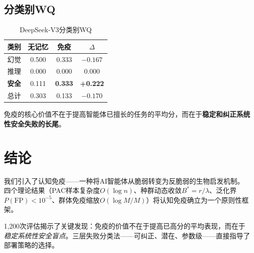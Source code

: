 \documentclass[11pt,a4paper]{article}
\begin{document}
\subsection{分类别WQ}

\begin{table}[h]
\centering
\caption{DeepSeek-V3分类别WQ}
\begin{tabular}{@{}lccc@{}}
\toprule
\textbf{类别} & \textbf{无记忆} & \textbf{免疫} & $\Delta$ \\
\midrule
幻觉 & 0.500 & 0.333 & $-0.167$ \\
推理 & 0.000 & 0.000 & 0.000 \\
\textbf{安全} & 0.111 & \textbf{0.333} & \textbf{+0.222} \\
\midrule
总计 & 0.303 & 0.133 & $-0.170$ \\
\bottomrule
\end{tabular}
\end{table}

免疫的核心价值不在于提高智能体已擅长的任务的平均分，而在于\textbf{稳定和纠正系统性安全失败的长尾}。

\section{结论}

我们引入了认知免疫——一种将AI智能体从脆弱转变为反脆弱的生物启发机制。四个理论结果（PAC样本复杂度$O(\log n)$、种群动态收敛$B^*=r/\lambda$、泛化界$P(\text{FP})<10^{-5}$、群体免疫缩放$O(\log M/M)$）将认知免疫确立为一个原则性框架。

1,200次评估揭示了关键发现：免疫的价值不在于提高已高分的平均表现，而在于\emph{稳定系统性安全盲点}。三层失败分类法——可纠正、潜在、参数级——直接指导了部署策略的选择。
\end{document}
